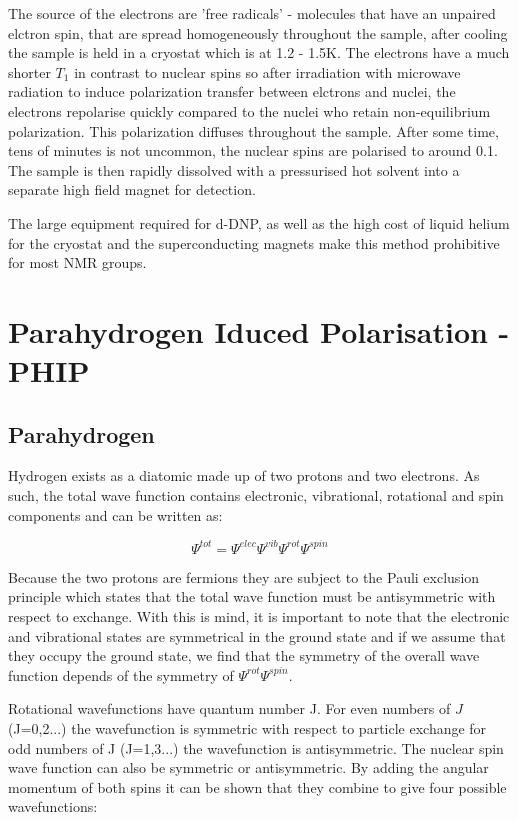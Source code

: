   The source of the electrons are 'free radicals' - molecules that have an unpaired elctron spin, that
  are spread homogeneously throughout the sample, after cooling the sample is held in a cryostat which is at
  1.2 - 1.5K. The electrons have a much shorter $T_1$ in contrast to nuclear spins so after irradiation with
  microwave radiation to induce polarization transfer between elctrons and nuclei, the electrons repolarise
  quickly compared to the nuclei who retain non-equilibrium polarization. This polarization diffuses throughout the
  sample. After some time, tens of minutes is not uncommon, the nuclear spins are polarised to around 0.1. The
  sample is then rapidly dissolved with a pressurised hot solvent into a separate high field magnet for detection.

  The large equipment required for d-DNP, as well as the high cost of liquid helium for the cryostat and
  the superconducting magnets make this method  prohibitive for most NMR groups.

 \section{Parahydrogen Iduced Polarisation - PHIP}

 \subsection{Parahydrogen}

 Hydrogen exists as a diatomic made up of two protons and two electrons. As such, the total
 wave function contains electronic, vibrational, rotational and spin components and can be
 written as:

 \begin{equation}
  \Psi^{tot} =\Psi^{elec}\Psi^{vib}\Psi^{rot}\Psi^{spin}
 \end{equation}

 Because the two protons are fermions they are subject to the Pauli exclusion principle
 which states that the total wave function must be antisymmetric with respect to exchange. With
 this is mind, it is important to note that the electronic and vibrational states are symmetrical in the ground state and if we assume that they occupy the ground state, we find that the symmetry of the overall wave function depends of the symmetry of $\Psi^{rot}$$\Psi^{spin}$.

 Rotational wavefunctions have quantum number J. For even numbers of $J$ (J=0,2...) the wavefunction is symmetric with respect to particle exchange for odd numbers of J (J=1,3...) the wavefunction is antisymmetric. The nuclear spin wave function can also be symmetric or antisymmetric. By adding the angular momentum of both spins it can be shown that they combine to give four possible wavefunctions:


